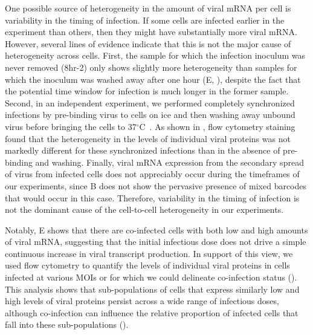 \documentclass[9pt,lineno]{elife}
\begin{document}
One possible source of heterogeneity in the amount of viral mRNA per cell is variability in the timing of infection.
If some cells are infected earlier in the experiment than others, then they might have substantially more viral mRNA.
However, several lines of evidence indicate that this is not the major cause of heterogeneity across cells.
First, the sample for which the infection inoculum was never removed (8hr-2) only shows slightly more heterogeneity than samples for which the inoculum was washed away after one hour (E, ), despite the fact that the potential time window for infection is much longer in the former sample.
Second, in an independent experiment, we performed completely synchronized infections by pre-binding virus to cells on ice and then washing away unbound virus before bringing the cells to 37$^{\circ}$C~\citep{Dapat:2014kv}.
As shown in , flow cytometry staining found that the heterogeneity in the levels of individual viral proteins was not markedly different for these synchronized infections than in the absence of pre-binding and washing.
Finally, viral mRNA expression from the secondary spread of virus from infected cells does not appreciably occur during the timeframes of our experiments, since B does not show the pervasive presence of mixed barcodes that would occur in this case.
Therefore, variability in the timing of infection is not the dominant cause of the cell-to-cell heterogeneity in our experiments.

Notably, E shows that there are co-infected cells with both low and high amounts of viral mRNA, suggesting that the initial infectious dose does not drive a simple continuous increase in viral transcript production.
In support of this view, we used flow cytometry to quantify the levels of individual viral proteins in cells infected at various MOIs or for which we could delineate co-infection status ().
This analysis shows that sub-populations of cells that express similarly low and high levels of viral proteins persist across a wide range of infectious doses, although co-infection can influence the relative proportion of infected cells that fall into these sub-populations ().
\end{document}
